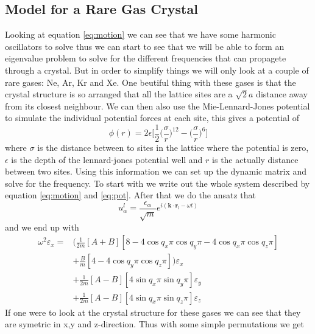 \documentclass[11pt]{article}
\begin{document}
\subsection{Model for a Rare Gas Crystal}
Looking at equation \ref{eq:motion} we can see that we have some harmonic oscillators to solve thus we can start to see that we will be able to form an eigenvalue problem to solve for the different frequencies that can propagete through a crystal. But in order to simplify things we will only look at a couple of rare gases: Ne, Ar, Kr and Xe. One beutiful thing with these gases is that the crystal structure is so arranged that all the lattice sites are a $\sqrt{2}a$ distance away from its closest neighbour. We can then also use the Mie-Lennard-Jones potential to simulate the individual potential forces at each site, this gives a potential of
\begin{equation}
	\phi(r) = 2 \epsilon \big[\frac{1}{2} \big(\frac{\sigma}{r}\big)^{12} - \big(\frac{\sigma}{r}\big)^6\big]
	\label{eq:pot}
\end{equation}
where $\sigma$ is the distance between to sites in the lattice where the potential is zero, $\epsilon$ is the depth of the lennard-jones potential well\cite{bib:wiki:mlj} and $r$ is the actually distance between two sites. Using this information we can set up the dynamic matrix and solve for the frequency. To start with we write out the whole system described by equation \ref{eq:motion} and \ref{eq:pot}. After that we do the ansatz that 
\begin{equation}
	u^l_{\alpha} = \frac{\epsilon_{\alpha}}{\sqrt{m}}e^{i(\mathbf{k}\cdot\mathbf{r}_l-\omega t)}
\end{equation}
and we end up with 
\begin{align}
	\omega^2\varepsilon_x = &\big( \frac{1}{2m} [A+B][8-4\cos{q_x\pi}\cos{q_y\pi}-4\cos{q_x\pi}\cos{q_z\pi}] \\
	&+ \frac{B}{m}[4-4\cos{q_y\pi}\cos{q_z\pi}]\big)\varepsilon_x \\
	&+\frac{1}{2m}[A-B][4\sin{q_x\pi}\sin{q_y\pi}]\varepsilon_y \\
	&+\frac{1}{2m}[A-B][4\sin{q_x\pi}\sin{q_z\pi}]\varepsilon_z
\end{align}
If one were to look at the crystal structure for these gases we can see that they are symetric in x,y and z-direction. Thus with some simple permutations we get
\end{document}
